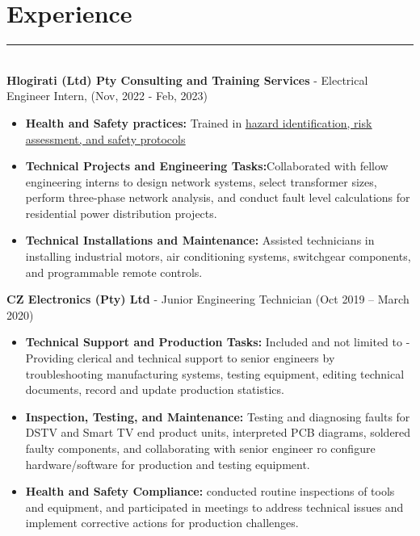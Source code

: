 \documentclass[12pt]{article}
\begin{document}
\vspace{-3mm}\section*{\fontsize{14}{1}\selectfont\color{color_29791}Experience}\vspace{-9pt} 
\rule{\textwidth}{0.4pt}
\vspace{2pt}
\\\textbf{Hlogirati (Ltd) Pty Consulting and Training Services} - Electrical Engineer Intern, (Nov, 2022 - Feb, 2023)
\vspace{-3mm}
\begin{itemize}
  \item \fontsize{9}{1}\textbf{Health and Safety practices:} Trained in \href{https://drive.google.com/file/d/1i5SDy8WoBzwGOmAEAcxJzVyCb1c7Gfqq/view?usp=sharing}{\underline{hazard identification, risk assessment, and safety protocols}}
  \vspace{-3mm}
  \item \textbf{Technical Projects and Engineering Tasks:}Collaborated with fellow engineering interns to design network systems, select transformer sizes, perform three-phase network analysis, and conduct fault level calculations for residential power distribution projects.
  \vspace{-3mm}
  \item \textbf{Technical Installations and Maintenance:} Assisted technicians in installing industrial motors, air conditioning systems, switchgear components, and programmable remote controls.
\end{itemize}

\vspace{0mm}
\hspace{-7mm}\textbf{ CZ Electronics (Pty) Ltd} - Junior Engineering Technician (Oct 2019 – March 2020)
\vspace{-3mm}
\begin{itemize}
  \item \fontsize{9}{1}\textbf{Technical Support and Production Tasks:} Included and not limited to - Providing clerical and technical support to senior engineers by troubleshooting manufacturing systems, testing equipment, editing technical documents, record and update production statistics.
  \vspace{-3mm}
  \item \textbf{Inspection, Testing, and Maintenance:} Testing and diagnosing faults for DSTV and Smart TV end product units, interpreted PCB  diagrams, soldered faulty components, and collaborating with senior engineer ro configure hardware/software for production and testing equipment. 
  \vspace{-3mm}
  \item \textbf{Health and Safety Compliance:} conducted routine inspections of tools and equipment, and participated in meetings to address technical issues and implement corrective actions for production challenges.
\end{itemize}
\end{document}
